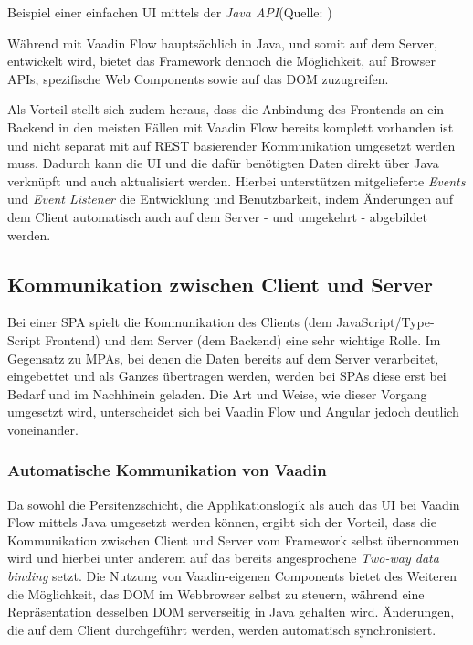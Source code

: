 \documentclass[a4paper,12pt,twoside]{scrreprt}
\begin{document}
\begin{listing}[ht]
    \inputminted[fontsize=\footnotesize,linenos]{java}{code/Vaadin_Java-UI-sample.java}
    \caption[Beispiel einer einfachen \acs{UI} mittels der \textit{Java API}]{Beispiel einer einfachen \acs{UI} mittels der \textit{Java API}\newline(Quelle: \cite[][]{vaadin_ltd_overview_2021})}
    \label{code:vaadin-ui-java-sample}
\end{listing}

Während mit Vaadin Flow hauptsächlich in Java, und somit auf dem Server, entwickelt wird, bietet das Framework dennoch die Möglichkeit, auf Browser \acsp{API}, spezifische Web Components sowie auf das \ac{DOM} zuzugreifen.

Als Vorteil stellt sich zudem heraus, dass die Anbindung des Frontends an ein Backend in den meisten Fällen mit Vaadin Flow bereits komplett vorhanden ist und nicht separat mit auf REST basierender Kommunikation umgesetzt werden muss. Dadurch kann die \acs{UI} und die dafür benötigten Daten direkt über Java verknüpft und auch aktualisiert werden. Hierbei unterstützen mitgelieferte \textit{Events} und \textit{Event Listener} die Entwicklung und Benutzbarkeit, indem Änderungen auf dem Client automatisch auch auf dem Server - und umgekehrt - abgebildet werden. \parencite[][]{vaadin_ltd_overview_2021-2}

\subsection{Kommunikation zwischen Client und Server}
\label{sub-sec:kommunikation-client-server}
Bei einer \ac{SPA} spielt die Kommunikation des Clients (dem JavaScript/Type-Script Frontend) und dem Server (dem Backend) eine sehr wichtige Rolle. Im Gegensatz zu \acp{MPA}, bei denen die Daten bereits auf dem Server verarbeitet, eingebettet und als Ganzes übertragen werden, werden bei \acsp{SPA} diese erst bei Bedarf und im Nachhinein geladen. Die Art und Weise, wie dieser Vorgang umgesetzt wird, unterscheidet sich bei Vaadin Flow und Angular jedoch deutlich voneinander.

\subsubsection{Automatische Kommunikation von Vaadin}
\label{sub-sub-sec:kommunikation-herangehensweise-vaadin}
Da sowohl die Persitenzschicht, die Applikationslogik als auch das \acl{UI} bei Vaadin Flow mittels Java umgesetzt werden können, ergibt sich der Vorteil, dass die Kommunikation zwischen Client und Server vom Framework selbst übernommen wird und hierbei unter anderem auf das bereits angesprochene \textit{Two-way data binding} setzt. Die Nutzung von Vaadin-eigenen Components bietet des Weiteren die Möglichkeit, das \ac{DOM} im Webbrowser selbst zu steuern, während eine Repräsentation desselben \ac{DOM} serverseitig in Java gehalten wird. Änderungen, die auf dem Client durchgeführt werden, werden automatisch synchronisiert. \parencite[][Framework - Introduction - Core Concepts]{vaadin_ltd_documentation_nodate}
\end{document}
